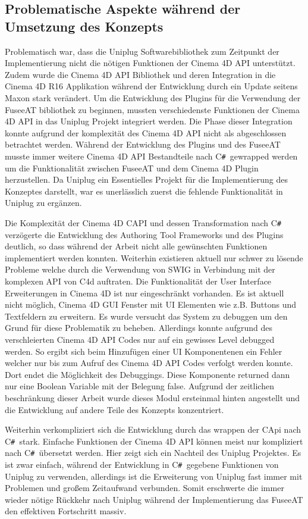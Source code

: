 \documentclass[pagesize, paper=a4, fontsize=12pt, titlepage=true, headings=small, headnosepline, abstractoff, liststotoc, nochapterprefix, plainheadsepline, twoside]{scrreprt}
\newcommand{\CSS}{C\texttt{\# }}
\newcommand{\CPP}{C\nolinebreak\hspace{-.05em}\raisebox{.4ex}{\tiny\bf +}\nolinebreak\hspace{-.10em}\raisebox{.4ex}{\tiny\bf +}}
\begin{document}
\subsection{Problematische Aspekte während der Umsetzung des Konzepts}
Problematisch war, dass die Uniplug Softwarebibliothek zum Zeitpunkt der Implementierung nicht die nötigen Funktionen der Cinema 4D API unterstützt. Zudem wurde die Cinema 4D API Bibliothek und deren Integration in die Cinema 4D R16 Applikation während der Entwicklung durch ein Update seitens Maxon stark verändert. Um die Entwicklung des Plugins für die Verwendung der FuseeAT bibliothek zu beginnen, mussten verschiedenste  Funktionen der Cinema 4D API in das Uniplug Projekt integriert werden. Die Phase dieser Integration konnte aufgrund der komplexität des Cinema 4D API nicht als abgeschlossen betrachtet werden. Während der Entwicklung des Plugins und des FuseeAT musste immer weitere Cinema 4D API Bestandteile nach \CSS gewrapped werden um die Funktionalität zwischen FuseeAT und dem Cinema 4D Plugin herzustellen. Da Uniplug ein Essentielles Projekt für die Implementierung des Konzeptes darstellt, war es unerlässlich zuerst die fehlende Funktionalität in Uniplug zu ergänzen.

Die Komplexität der Cinema 4D \CPP API und dessen Transformation nach \CSS verzögerte die Entwicklung des Authoring Tool Frameworks und des Plugins deutlich, so dass während der Arbeit nicht alle gewünschten Funktionen implementiert werden konnten. Weiterhin existieren aktuell nur schwer zu lösende Probleme welche durch die Verwendung von SWIG  in Verbindung mit der komplexen API von C4d auftraten. Die Funktionalität der User Interface Erweiterungen in Cinema 4D ist nur eingeschränkt vorhanden. Es ist aktuell nicht möglich, Cinema 4D GUI Fenster mit UI Elementen wie z.B. Buttons und Textfeldern zu erweitern. Es wurde versucht das System zu debuggen um den Grund für diese Problematik zu beheben. Allerdings konnte aufgrund des verschleierten Cinema 4D API Codes nur auf ein gewisses Level debugged werden. So ergibt sich beim Hinzufügen einer UI Komponentenen ein Fehler welcher nur bis zum Aufruf des Cinema 4D API Codes verfolgt werden konnte. Dort endet die Möglichkeit des Debuggings. Diese Komponente returned dann nur eine Boolean Variable mit der Belegung false. Aufgrund der zeitlichen beschränkung dieser Arbeit wurde dieses Modul ersteinmal hinten angestellt und die Entwicklung auf andere Teile des Konzepts konzentriert.

Weiterhin verkompliziert sich die Entwicklung durch das wrappen der \CPP Api nach \CSS stark. Einfache Funktionen der Cinema 4D API können meist nur kompliziert nach \CSS übersetzt werden. Hier zeigt sich ein Nachteil des Uniplug Projektes. Es ist zwar einfach, während der Entwicklung in \CSS gegebene Funktionen von Uniplug zu verwenden, allerdings ist die Erweiterung von Uniplug fast immer mit Problemen und großem Zeitaufwand verbunden. Somit erschwerte die immer wieder nötige Rückkehr nach Uniplug während der Implementierung das FuseeAT den effektiven Fortschritt massiv.
\end{document}
